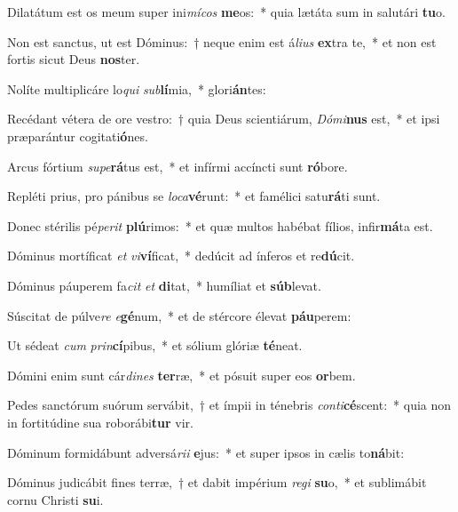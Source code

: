 \item Dilatátum est os meum super ini\textit{mí}\textit{cos} \textbf{me}os:~* quia lætáta sum in salutári \textbf{tu}o.
\item Non est sanctus, ut est Dóminus:~† neque enim est á\textit{li}\textit{us} \textbf{ex}tra te,~* et non est fortis sicut Deus \textbf{nos}ter.
\item Nolíte multiplicáre lo\textit{qui} \textit{sub}\textbf{lí}mia,~* glori\textbf{án}tes:
\item Recédant vétera de ore vestro:~† quia Deus scientiárum, \textit{Dó}\textit{mi}\textbf{nus} est,~* et ipsi præparántur cogitati\textbf{ó}nes.
\item Arcus fórtium \textit{su}\textit{pe}\textbf{rá}tus est,~* et infírmi accíncti sunt \textbf{ró}bore.
\item Repléti prius, pro pánibus se \textit{lo}\textit{ca}\textbf{vé}runt:~* et famélici satu\textbf{rá}ti sunt.
\item Donec stérilis pé\textit{pe}\textit{rit} \textbf{plú}rimos:~* et quæ multos habébat fílios, infir\textbf{má}ta est.
\item Dóminus mortíficat \textit{et} \textit{vi}\textbf{ví}ficat,~* dedúcit ad ínferos et re\textbf{dú}cit.
\item Dóminus páuperem fa\textit{cit} \textit{et} \textbf{di}tat,~* humíliat et \textbf{súb}levat.
\item Súscitat de púlve\textit{re} \textit{e}\textbf{gé}num,~* et de stércore élevat \textbf{páu}perem:
\item Ut sédeat \textit{cum} \textit{prin}\textbf{cí}pibus,~* et sólium glóriæ \textbf{té}neat.
\item Dómini enim sunt cár\textit{di}\textit{nes} \textbf{ter}ræ,~* et pósuit super eos \textbf{or}bem.
\item Pedes sanctórum suórum servábit,~† et ímpii in ténebris \textit{con}\textit{ti}\textbf{cé}scent:~* quia non in fortitúdine sua roborábi\textbf{tur} vir.
\item Dóminum formidábunt adversá\textit{ri}\textit{i} \textbf{e}jus:~* et super ipsos in cælis to\textbf{ná}bit:
\item Dóminus judicábit fines terræ,~† et dabit impérium \textit{re}\textit{gi} \textbf{su}o,~* et sublimábit cornu Christi \textbf{su}i.
